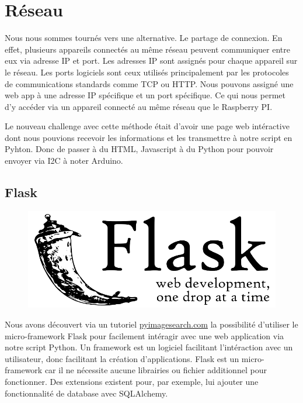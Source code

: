 \documentclass[
	a4paper,									%
	11pt,										%
	twoside,									%
	openright,									%
	notitlepage,									%
	parskip=half,								%
]{scrreprt}										%
\begin{document}
\chapter{Réseau}

Nous nous sommes tournés vers une alternative. Le partage de connexion. En effet, plusieurs appareils connectés au même
réseau peuvent communiquer entre eux via adresse IP et port. Les adresses IP sont assignés pour chaque appareil sur 
le réseau. Les ports logiciels sont ceux utilisés principalement par les protocoles de communications standards comme TCP ou 
HTTP. Nous pouvons assigné une web app à une adresse IP spécifique et un port spécifique. Ce qui nous permet d'y accéder via 
un appareil connecté au même réseau que le Raspberry PI. \par

Le nouveau challenge avec cette méthode était d'avoir une page web intéractive dont nous pouvions recevoir les informations
et les transmettre à notre script en Pyhton. Donc de passer à du HTML, Javascript à du Python pour pouvoir envoyer via I2C 
à noter Arduino. \par

\section{Flask}

\begin{figure}[!ht]
	\centering
	\includegraphics[scale=.3]{img/Flask.png}
	\vspace{.5cm}
	\label{Flask}
\end{figure}

Nous avons découvert via un tutoriel \href{https://pyimagesearch.com/2019/09/02/opencv-stream-video-to-web-browser-html-page/}{pyimagesearch.com}
la possibilité d'utiliser le micro-framework Flask pour facilement intéragir avec une web application via notre script Python.
Un framework est un logiciel facilitant l'intéraction avec un utilisateur, donc facilitant la création d'applications. 
Flask est un micro-framework car il ne nécessite aucune librairies ou fichier additionnel pour fonctionner. Des extensions
existent pour, par exemple, lui ajouter une fonctionnalité de database avec SQLAlchemy. \par
\end{document}
